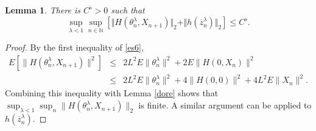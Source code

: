 \documentclass[a4paper]{article}
\newtheorem{lemma}[theorem]{Lemma}
\begin{document}
\begin{lemma}\label{easy}
	There is $C^{\flat}>0$ such that
	$$
\sup_{\lambda<1}\sup_{n\in\mathbb{N}} \left[\Vert H(\theta^{\lambda}_n,X_{n+1}) \Vert_2+ \Vert h(\overline{z}_n^{\lambda})\Vert_2\right]\leq C^{\flat}.
	$$
\end{lemma}
\begin{proof}
By the first inequality of \eqref{es6},
	\begin{eqnarray*}
	E\left[\|H(\theta^{\lambda}_n,X_{n+1})\|^2  \right] &\le& 2 L^2 E\| \theta^{\lambda}_n \|^2 + 2 E \| H(0, X_n) \|^2 \\
	&\le& 2L^2E\|\theta^{\lambda}_n\|^2 + 4 \| H(0,0)\|^2	 + 4 L^2 E \|X_n\|^2.
	\end{eqnarray*}
Combining this inequality with Lemma \ref{dore} shows that $\sup_{\lambda<1}\sup_{n} \|H(\theta^{\lambda}_n,X_{n+1})\|_2 $ is finite.
A similar argument can be applied to $h(\overline{z}_n^{\lambda})$.
\end{proof}
\end{document}
